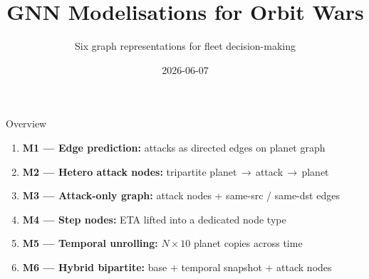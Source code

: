 \documentclass[10pt]{beamer}
\title{GNN Modelisations for Orbit Wars}
\subtitle{Six graph representations for fleet decision-making}
\date{2026-06-07}
\author{}
\begin{document}
\maketitle

\begin{frame}{Overview}
\begin{enumerate}
  \item \textbf{M1 — Edge prediction:} attacks as directed edges on planet graph
  \item \textbf{M2 — Hetero attack nodes:} tripartite planet\,$\to$\,attack\,$\to$\,planet
  \item \textbf{M3 — Attack-only graph:} attack nodes + same-src / same-dst edges
  \item \textbf{M4 — Step nodes:} ETA lifted into a dedicated node type
  \item \textbf{M5 — Temporal unrolling:} $N\times10$ planet copies across time
  \item \textbf{M6 — Hybrid bipartite:} base $+$ temporal snapshot $+$ attack nodes
\end{enumerate}

\vspace{6pt}
\end{frame}
\end{document}
